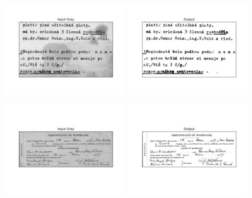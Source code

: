 \documentclass[titlepage]{article}
\begin{document}
\begin{center}
\includegraphics[width=0.49\textwidth]{img_1_gray.png}
\includegraphics[width=0.49\textwidth]{img_1_output.png}
\end{center}

\begin{center}
\includegraphics[width=0.49\textwidth]{img_2_gray.png}
\includegraphics[width=0.49\textwidth]{img_2_output.png}
\end{center}
\end{document}
